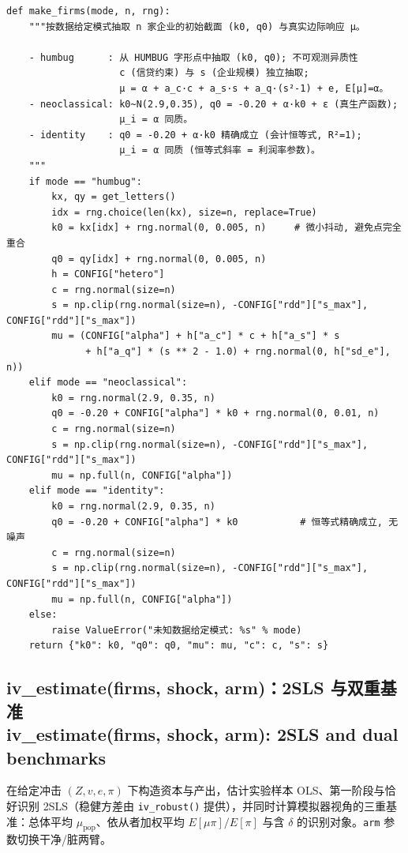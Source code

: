 \documentclass[12pt,a4paper]{ctexart}
\begin{document}
\begin{lstlisting}[style=pycode]
def make_firms(mode, n, rng):
    """按数据给定模式抽取 n 家企业的初始截面 (k0, q0) 与真实边际响应 μ。

    - humbug      : 从 HUMBUG 字形点中抽取 (k0, q0); 不可观测异质性
                    c (信贷约束) 与 s (企业规模) 独立抽取;
                    μ = α + a_c·c + a_s·s + a_q·(s²-1) + e, E[μ]=α。
    - neoclassical: k0~N(2.9,0.35), q0 = -0.20 + α·k0 + ε (真生产函数);
                    μ_i = α 同质。
    - identity    : q0 = -0.20 + α·k0 精确成立 (会计恒等式, R²=1);
                    μ_i = α 同质 (恒等式斜率 = 利润率参数)。
    """
    if mode == "humbug":
        kx, qy = get_letters()
        idx = rng.choice(len(kx), size=n, replace=True)
        k0 = kx[idx] + rng.normal(0, 0.005, n)     # 微小抖动, 避免点完全重合
        q0 = qy[idx] + rng.normal(0, 0.005, n)
        h = CONFIG["hetero"]
        c = rng.normal(size=n)
        s = np.clip(rng.normal(size=n), -CONFIG["rdd"]["s_max"], CONFIG["rdd"]["s_max"])
        mu = (CONFIG["alpha"] + h["a_c"] * c + h["a_s"] * s
              + h["a_q"] * (s ** 2 - 1.0) + rng.normal(0, h["sd_e"], n))
    elif mode == "neoclassical":
        k0 = rng.normal(2.9, 0.35, n)
        q0 = -0.20 + CONFIG["alpha"] * k0 + rng.normal(0, 0.01, n)
        c = rng.normal(size=n)
        s = np.clip(rng.normal(size=n), -CONFIG["rdd"]["s_max"], CONFIG["rdd"]["s_max"])
        mu = np.full(n, CONFIG["alpha"])
    elif mode == "identity":
        k0 = rng.normal(2.9, 0.35, n)
        q0 = -0.20 + CONFIG["alpha"] * k0           # 恒等式精确成立, 无噪声
        c = rng.normal(size=n)
        s = np.clip(rng.normal(size=n), -CONFIG["rdd"]["s_max"], CONFIG["rdd"]["s_max"])
        mu = np.full(n, CONFIG["alpha"])
    else:
        raise ValueError("未知数据给定模式: %s" % mode)
    return {"k0": k0, "q0": q0, "mu": mu, "c": c, "s": s}
\end{lstlisting}

\subsection[iv\_estimate]{iv\_estimate(firms, shock, arm)：2SLS 与双重基准\\[1pt]\normalsize iv\_estimate(firms, shock, arm): 2SLS and dual benchmarks}

在给定冲击 $(Z, v, e, \pi)$ 下构造资本与产出，估计实验样本 OLS、第一阶段与恰好识别 2SLS（稳健方差由 \texttt{iv\_robust()} 提供），并同时计算模拟器视角的三重基准：总体平均 $\mu_{\mathrm{pop}}$、依从者加权平均 $E[\mu\pi]/E[\pi]$ 与含 $\delta$ 的识别对象。\texttt{arm} 参数切换干净/脏两臂。
\end{document}
